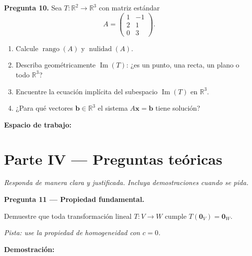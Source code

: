 \documentclass[12pt, letterpaper]{article}
\newcommand{\R}{\mathbb{R}}
\newcommand{\Img}{\operatorname{Im}}    %
\newcommand{\rango}{\operatorname{rango}}
\newcommand{\nulidad}{\operatorname{nulidad}}
\newcommand{\mat}[1]{\begin{pmatrix}#1\end{pmatrix}}
\begin{document}
\begin{cajapregunta}
\textbf{Pregunta 10.}
Sea $T:\R^2\to\R^3$ con matriz estándar
\[
  A = \mat{1 & -1 \\ 2 & 1 \\ 0 & 3}.
\]
\begin{enumerate}[label=\alph*)]
  \item Calcule $\rango(A)$ y $\nulidad(A)$.
  \item Describa geométricamente $\Img(T)$: ¿es un punto, una recta, un plano o todo $\R^3$?
  \item Encuentre la ecuación implícita del subespacio $\Img(T)$ en $\R^3$.
  \item ¿Para qué vectores $\mathbf{b}\in\R^3$ el sistema $A\mathbf{x}=\mathbf{b}$ tiene solución?
\end{enumerate}
\end{cajapregunta}

\vspace{4pt}

\noindent\textbf{Espacio de trabajo:}
\vspace{7cm}

\newpage

\section*{\color{azuloscuro} Parte IV — Preguntas teóricas}
\textit{Responda de manera clara y justificada. Incluya demostraciones cuando se pida.}

\vspace{6pt}

\begin{cajapregunta}
\textbf{Pregunta 11 — Propiedad fundamental.}

Demuestre que toda transformación lineal $T:V\to W$ cumple $T(\mathbf{0}_V)=\mathbf{0}_W$.

\noindent\textit{Pista: use la propiedad de homogeneidad con $c=0$.}
\end{cajapregunta}

\vspace{4pt}

\noindent\textbf{Demostración:}
\vspace{5cm}
\end{document}
